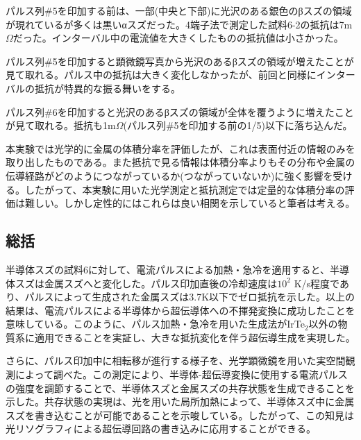 パルス列\#5を印加する前は、一部(中央と下部)に光沢のある銀色のβスズの領域が現れているが多くは黒いαスズだった。4端子法で測定した試料6-2の抵抗は7m$\Omega$だった。インターバル中の電流値を大きくしたものの抵抗値は小さかった。

パルス列\#5を印加すると顕微鏡写真から光沢のあるβスズの領域が増えたことが見て取れる。パルス中の抵抗は大きく変化しなかったが、前回と同様にインターバルの抵抗が特異的な振る舞いをする。

パルス列\#6を印加すると光沢のあるβスズの領域が全体を覆うように増えたことが見て取れる。抵抗も1m$\Omega$(パルス列\#5を印加する前の1/5)以下に落ち込んだ。

本実験では光学的に金属の体積分率を評価したが、これは表面付近の情報のみを取り出したものである。また抵抗で見る情報は体積分率よりもその分布や金属の伝導経路がどのようにつながっているか(つながっていないか)に強く影響を受ける。したがって、本実験に用いた光学測定と抵抗測定では定量的な体積分率の評価は難しい。しかし定性的にはこれらは良い相関を示していると筆者は考える。

\subsection{総括}
半導体スズの試料6に対して、電流パルスによる加熱・急冷を適用すると、半導体スズは金属スズへと変化した。パルス印加直後の冷却速度は$10^2$ K/s程度であり、パルスによって生成された金属スズは3.7K以下でゼロ抵抗を示した。以上の結果は、電流パルスによる半導体から超伝導体への不揮発変換に成功したことを意味している。このように、パルス加熱・急冷を用いた生成法がIrTe$_2$以外の物質系に適用できることを実証し、大きな抵抗変化を伴う超伝導生成を実現した。

さらに、パルス印加中に相転移が進行する様子を、光学顕微鏡を用いた実空間観測によって調べた。この測定により、半導体-超伝導変換に使用する電流パルスの強度を調節することで、半導体スズと金属スズの共存状態を生成できることを示した。共存状態の実現は、光を用いた局所加熱によって、半導体スズ中に金属スズを書き込むことが可能であることを示唆している。したがって、この知見は光リソグラフィによる超伝導回路の書き込みに応用することができる。


\clearpage

